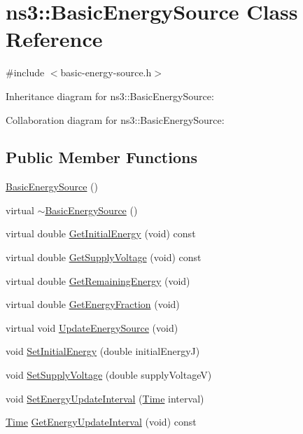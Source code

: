 \hypertarget{classns3_1_1BasicEnergySource}{}\section{ns3\+:\+:Basic\+Energy\+Source Class Reference}
\label{classns3_1_1BasicEnergySource}


{\ttfamily \#include $<$basic-\/energy-\/source.\+h$>$}



Inheritance diagram for ns3\+:\+:Basic\+Energy\+Source\+:


Collaboration diagram for ns3\+:\+:Basic\+Energy\+Source\+:
\subsection*{Public Member Functions}
\begin{DoxyCompactItemize}
\item 
\hyperlink{classns3_1_1BasicEnergySource_a27e2c2df41959fc28689bd99c04687ec}{Basic\+Energy\+Source} ()
\item 
virtual \hyperlink{classns3_1_1BasicEnergySource_a8df47ad8c163ec25a0debff67c01a79c}{$\sim$\+Basic\+Energy\+Source} ()
\item 
virtual double \hyperlink{classns3_1_1BasicEnergySource_a416b12327490de666d341bf0cd4331ce}{Get\+Initial\+Energy} (void) const 
\item 
virtual double \hyperlink{classns3_1_1BasicEnergySource_a19f4054a9ae5f63216067b9ff7132ae6}{Get\+Supply\+Voltage} (void) const 
\item 
virtual double \hyperlink{classns3_1_1BasicEnergySource_a35775aa9a2496255e9f075a9709886b0}{Get\+Remaining\+Energy} (void)
\item 
virtual double \hyperlink{classns3_1_1BasicEnergySource_aa8f5de0d9c0707b8ae2a005f7a57680e}{Get\+Energy\+Fraction} (void)
\item 
virtual void \hyperlink{classns3_1_1BasicEnergySource_a184cad1de97de7162e18f976d987bdaf}{Update\+Energy\+Source} (void)
\item 
void \hyperlink{classns3_1_1BasicEnergySource_ae554fd5c9a66409a364b1d58f20bb4cc}{Set\+Initial\+Energy} (double initial\+EnergyJ)
\item 
void \hyperlink{classns3_1_1BasicEnergySource_a9271fd41ec952e117e76ba6cc130046d}{Set\+Supply\+Voltage} (double supply\+VoltageV)
\item 
void \hyperlink{classns3_1_1BasicEnergySource_a077f464384ffcb26db5964a8962d5fb2}{Set\+Energy\+Update\+Interval} (\hyperlink{classns3_1_1Time}{Time} interval)
\item 
\hyperlink{classns3_1_1Time}{Time} \hyperlink{classns3_1_1BasicEnergySource_a79566e2cb8a0e9a7f41fdeab71b8ff9c}{Get\+Energy\+Update\+Interval} (void) const 
\end{DoxyCompactItemize}

